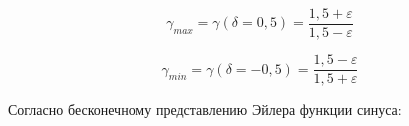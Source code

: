\begin{equation}
\label{eq:equation69}
\gamma_{max} = \gamma(\delta = 0,5) = \frac{1,5+ \varepsilon}{1,5 - \varepsilon}
\end{equation}

\begin{equation}
\label{eq:equation70}
\gamma_{min} = \gamma(\delta = -0,5) = \frac{1,5 - \varepsilon}{1,5 + \varepsilon}
\end{equation}

Согласно бесконечному представлению Эйлера функции синуса:

%
%
%
%
%
